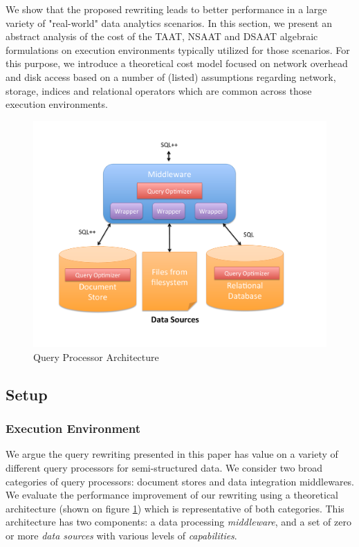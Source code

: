 We show that the proposed rewriting leads to better performance in a large variety of "real-world" data analytics scenarios. In this section, we present an abstract analysis of the cost of the TAAT, NSAAT and DSAAT algebraic formulations on execution environments typically utilized for those scenarios. For this purpose, we introduce a theoretical cost model focused on network overhead and disk access  based on a number of (listed) assumptions regarding network, storage, indices and relational operators which are common across those execution environments.

\begin{figure}[h]
\centering
\caption{Query Processor Architecture \label{fig:architecture}}
\includegraphics[width=\linewidth]{images/Architecture.pdf}
\end{figure}

\subsection{Setup}

\subsubsection{Execution Environment}

We argue the query rewriting presented in this paper has value on a variety of different query processors for semi-structured data. We consider two broad categories of query processors: document stores and data integration middlewares. We evaluate the performance improvement of our rewriting using a theoretical architecture (shown on figure \ref{fig:architecture}) which is representative of both categories. This architecture has two components: a data processing \emph{middleware}, and a set of zero or more \emph{data sources} with various levels of \emph{capabilities}.

